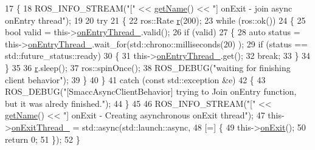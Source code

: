 \begin{DoxyCode}
17     \{
18         ROS\_INFO\_STREAM(\textcolor{stringliteral}{"["} << \hyperlink{classsmacc_1_1ISmaccClientBehavior_a18e4bec9460b010f2894c0f7e7064a34}{getName}() << \textcolor{stringliteral}{"] onExit - join async onEntry thread"});
19 
20         \textcolor{keywordflow}{try}
21         \{
22             ros::Rate \hyperlink{namespacefake__cube__perception__node_a36e88703ab69fd35065e8a8d9344903e}{r}(200);
23             \textcolor{keywordflow}{while} (ros::ok())
24             \{
25                 \textcolor{keywordtype}{bool} valid = this->\hyperlink{classsmacc_1_1SmaccAsyncClientBehavior_a6346e036a68f41c4397d7336f8519645}{onEntryThread\_}.valid();
26                 \textcolor{keywordflow}{if} (valid)
27                 \{
28                     \textcolor{keyword}{auto} status = this->\hyperlink{classsmacc_1_1SmaccAsyncClientBehavior_a6346e036a68f41c4397d7336f8519645}{onEntryThread\_}.wait\_for(std::chrono::milliseconds(20)
      );
29                     \textcolor{keywordflow}{if} (status == std::future\_status::ready)
30                     \{
31                         this->\hyperlink{classsmacc_1_1SmaccAsyncClientBehavior_a6346e036a68f41c4397d7336f8519645}{onEntryThread\_}.get();
32                         \textcolor{keywordflow}{break};
33                     \}
34                 \}
35 
36                 \hyperlink{namespacefake__cube__perception__node_a36e88703ab69fd35065e8a8d9344903e}{r}.sleep();
37                 ros::spinOnce();
38                 ROS\_DEBUG(\textcolor{stringliteral}{"waiting for finishing client behavior"});
39             \}
40         \}
41         \textcolor{keywordflow}{catch} (\textcolor{keyword}{const} std::exception &e)
42         \{
43             ROS\_DEBUG(\textcolor{stringliteral}{"[SmaccAsyncClientBehavior] trying to Join onEntry function, but it was alredy
       finished."});
44         \}
45 
46         ROS\_INFO\_STREAM(\textcolor{stringliteral}{"["} << \hyperlink{classsmacc_1_1ISmaccClientBehavior_a18e4bec9460b010f2894c0f7e7064a34}{getName}() << \textcolor{stringliteral}{"] onExit - Creating asynchronous onExit thread"});
47         this->\hyperlink{classsmacc_1_1SmaccAsyncClientBehavior_af76d1c36b4a10425f2da043545b73299}{onExitThread\_} = std::async(std::launch::async,
48                                          [=] \{
49                                              this->\hyperlink{classsmacc_1_1ISmaccClientBehavior_a36bf771905e3bf750909a15e4215a9b3}{onExit}();
50                                              \textcolor{keywordflow}{return} 0;
51                                          \});
52     \}
\end{DoxyCode}
